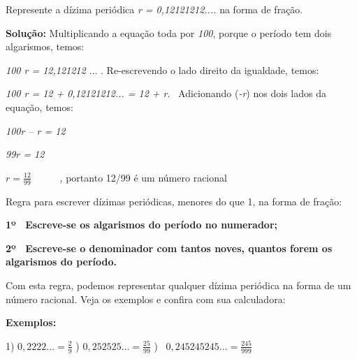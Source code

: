 \begin{texemplo}
Represente a dízima periódica \textit{r = 0,12121212....} na forma de fração.

\begin{justify}
\textbf{Solução: }Multiplicando a equação toda por \textit{100}, porque o período tem dois algarismos, temos:
\end{justify}


\quad \textit{100 r = 12,121212 $ \ldots $ } . Re-escrevendo o lado direito da igualdade, temos:\quad 

\quad \textit{100 r = 12 + 0,12121212... = 12 + r}.~ Adicionando (\textit{-r}) nos dois lados da equação, temos:

\quad \textit{100r – r = 12}

\textit{\quad 99r = 12}

\quad  \( r=\frac{12}{99}~~~ \) \textit{~~~ ,} portanto 12/99 é um número racional\textit{\qedsymbol{}}
\end{texemplo}
\quad Regra para escrever dízimas periódicas, menores do que 1, na forma de fração:

\begin{caixa}
\begin{justify}
\textbf{1º~  Escreve-se os algarismos do período no numerador;}
\end{justify}

\begin{justify}
\textbf{2º~  Escreve-se o denominador com tantos noves, quantos forem os algarismos do período.}
\end{justify}
\end{caixa}
\quad Com esta regra, podemos representar qualquer dízima periódica na forma de um número racional. Veja os exemplos e confira com sua calculadora:

\textbf{Exemplos:}

1)  \( 0,2222 \ldots =\frac{2}{9} \)  \quad {})  \( 0,252525 \ldots =\frac{25}{99} \) \quad {})~  \( 0,245245245 \ldots =\frac{245}{999} \) 

